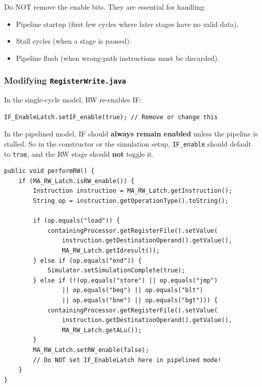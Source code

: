\documentclass[12pt,a4paper]{article}
\begin{document}
\begin{warningbox}
Do NOT remove the enable bits. They are essential for handling:
\begin{itemize}
    \item Pipeline startup (first few cycles where later stages have no valid data).
    \item Stall cycles (when a stage is paused).
    \item Pipeline flush (when wrong-path instructions must be discarded).
\end{itemize}
\end{warningbox}

\subsubsection{Modifying \texttt{RegisterWrite.java}}
In the single-cycle model, RW re-enables IF:
\begin{lstlisting}[style=javastyle]
IF_EnableLatch.setIF_enable(true); // Remove or change this
\end{lstlisting}

In the pipelined model, IF should \textbf{always remain enabled} unless the pipeline is stalled. So in the constructor or the simulation setup, \texttt{IF\_enable} should default to \texttt{true}, and the RW stage should \textbf{not} toggle it.

\begin{lstlisting}[style=javastyle, caption={Modified RW stage (key change)}]
public void performRW() {
    if (MA_RW_Latch.isRW_enable()) {
        Instruction instruction = MA_RW_Latch.getInstruction();
        String op = instruction.getOperationType().toString();

        if (op.equals("load")) {
            containingProcessor.getRegisterFile().setValue(
                instruction.getDestinationOperand().getValue(),
                MA_RW_Latch.getIdresult());
        } else if (op.equals("end")) {
            Simulator.setSimulationComplete(true);
        } else if (!(op.equals("store") || op.equals("jmp")
                || op.equals("beq") || op.equals("blt")
                || op.equals("bne") || op.equals("bgt"))) {
            containingProcessor.getRegisterFile().setValue(
                instruction.getDestinationOperand().getValue(),
                MA_RW_Latch.getALu());
        }
        MA_RW_Latch.setRW_enable(false);
        // Do NOT set IF_EnableLatch here in pipelined mode!
    }
}
\end{lstlisting}
\end{document}
